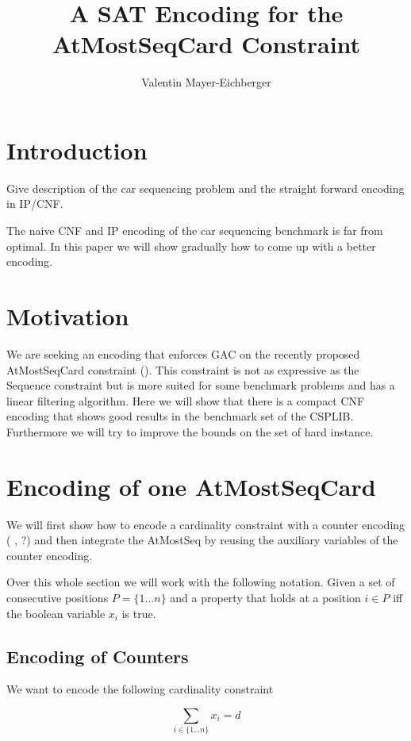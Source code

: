 \documentclass[]{llncs}
\author{Valentin Mayer-Eichberger}
\institute{NICTA \\ University of New South Wales \\
\email{valentin.mayer-eichberger@nicta.com.au}}
\title{A SAT Encoding for the AtMostSeqCard Constraint}
\newcommand{\TODO}[1]{ {\color{red}{#1} }}
\begin{document}
 \maketitle

\section{Introduction}

Give description of the car sequencing problem and the straight
forward encoding in IP/CNF. 

The naive CNF and IP encoding of the car sequencing benchmark is
far from optimal. In this paper we will show gradually how to come up
with a better encoding. 

\section{Motivation}

We are seeking an encoding that enforces GAC on the recently proposed
AtMostSeqCard constraint (\cite{Siala12}). This constraint is not as expressive as the
Sequence constraint but is more suited for some benchmark problems and
has a linear filtering algorithm. Here we will show that there is a
compact CNF encoding that shows good results in the benchmark set of the
CSPLIB. Furthermore we will try to improve the bounds on the set of hard
instance. 

\section{Encoding of one AtMostSeqCard}

We will first show how to encode a cardinality constraint with a counter
encoding (\TODO{ref}, \cite{Een06} ?) and then integrate the AtMostSeq
by reusing the auxiliary variables of the counter encoding. 

Over this whole section we will work with the following notation. Given
a set of consecutive positions $P=\{1\ldots n\}$ and a property that
holds at a position $i\in P$ iff the boolean variable $x_i$ is true. 

\subsection{Encoding of Counters}

We want to encode the following cardinality constraint

$$ \sum_{i\in \{1\ldots n\}} x_{i} = d $$
\end{document}
